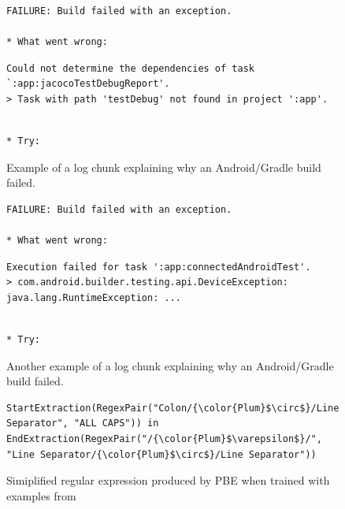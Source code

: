 \begin{figure}[!t]
  \centering
  \begin{lstlisting}[breaklines=true,frame=tlr]
FAILURE: Build failed with an exception.

* What went wrong:
  \end{lstlisting}
  \vspace{-\baselineskip}
  \begin{lstlisting}[backgroundcolor=\color{Cerulean!60},breaklines=true,frame=rl]
Could not determine the dependencies of task `:app:jacocoTestDebugReport'.
> Task with path 'testDebug' not found in project ':app'.
  \end{lstlisting}
  \vspace{-\baselineskip}
  \begin{lstlisting}[breaklines=true,frame=blr]

* Try:
  \end{lstlisting}  
  \caption{Example of a log chunk explaining why an Android/Gradle build failed.}
  \label{lst:chunk-example-1}
\end{figure}

\begin{figure}[!t]
  \centering
  \begin{lstlisting}[breaklines=true,frame=tlr]
FAILURE: Build failed with an exception.

* What went wrong:
  \end{lstlisting}
  \vspace{-\baselineskip}
  \begin{lstlisting}[backgroundcolor=\color{Cerulean!60},breaklines=true,frame=rl]
Execution failed for task ':app:connectedAndroidTest'.
> com.android.builder.testing.api.DeviceException: java.lang.RuntimeException: ...
  \end{lstlisting}
  \vspace{-\baselineskip}
  \begin{lstlisting}[breaklines=true,frame=blr]

* Try:
  \end{lstlisting}  
  \caption{Another example of a log chunk explaining why an Android/Gradle build failed.}
  \label{lst:chunk-example-2}
\end{figure}

\begin{figure}[!t]
  \centering
  \begin{lstlisting}[breaklines=true]
StartExtraction(RegexPair("Colon/{\color{Plum}$\circ$}/Line Separator", "ALL CAPS")) in EndExtraction(RegexPair("/{\color{Plum}$\varepsilon$}/", "Line Separator/{\color{Plum}$\circ$}/Line Separator"))
  \end{lstlisting}  
  \caption{Simiplified regular expression produced by PBE when trained
  with examples from }
  \label{lst:prose-program-simplified}
\end{figure}

